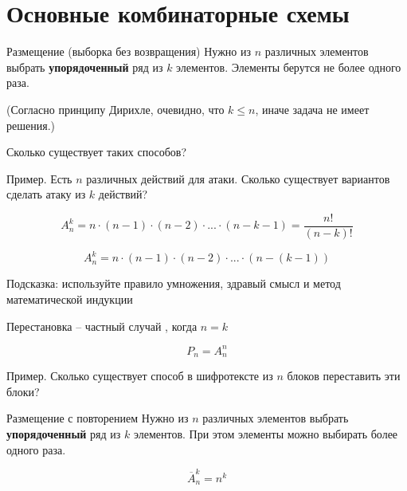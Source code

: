 \section{Основные комбинаторные схемы}\label{section:main_combinatorics_sxems}


\begin{frame}{Размещение (выборка без возвращения)}
Нужно из
$n$
различных элементов 
выбрать \textbf{упорядоченный}
ряд из $k$
элементов. 
Элементы берутся не более одного раза.

(Согласно принципу Дирихле, очевидно, что $k \leqslant n$,
иначе задача не имеет решения.)


Сколько существует таких способов?   

Пример.
Есть $n$ различных действий для атаки.
Сколько существует вариантов сделать атаку из $k$ действий?

\begin{equation}
A_n^k = n \cdot (n-1) \cdot (n-2) \cdot ... \cdot (n-k-1) = \frac{n!} {\left(n-k\right)!}
\end{equation}    


\end{frame}

\begin{frame}


\begin{equation}
A_n^k = n \cdot (n-1) \cdot (n-2) \cdot ... \cdot \left(n-(k-1)\right)
\end{equation}  

Подсказка: используйте правило умножения, здравый смысл 
и метод математической индукции

\end{frame}



\begin{frame}{Перестановка}
 -- 
частный случай , 
когда $n=k$ 

\begin{equation}
P_n = A_n^n
\end{equation}

Пример. Сколько существует способ в шифротексте из $n$ блоков переставить эти блоки?
\end{frame}


\begin{frame}{Размещение с повторением}
Нужно из
$n$
различных элементов 
выбрать \textbf{упорядоченный}
ряд из $k$
элементов. 
При этом элементы можно выбирать более одного раза.

\begin{equation}
\overline{A}_n^k = n ^ k
\end{equation} 

\end{frame}

